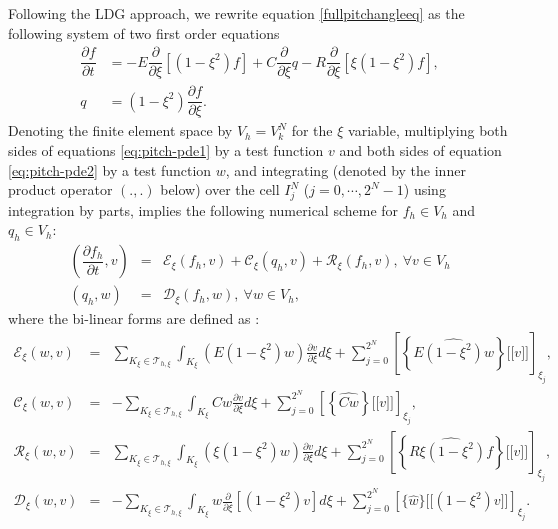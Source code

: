 \documentclass[preprint,11pt]{elsarticle}
\def\ljump{{[\![}}
\def\rjump{{]\!]}}
\begin{document}
Following the LDG approach, we rewrite equation \ref{fullpitchangleeq} as the following system of two first order equations
%
\begin{align}
	\dfrac{\partial f}{\partial t} &= -E\dfrac{\partial}{\partial\xi}[(1-\xi^2)f]+C\dfrac{\partial}{\partial\xi}q-R\dfrac{\partial}{\partial\xi}[\xi(1-\xi^2)f],\label{eq:pitch-pde1}\\
	q &= (1-\xi^2)\dfrac{\partial f}{\partial\xi}. \label{eq:pitch-pde2}
\end{align}
%
Denoting the finite element space by $V_h = V_k^N$ for the $\xi$ variable, multiplying both sides of equations \ref{eq:pitch-pde1} by a test function $v$ and both sides of equation \ref{eq:pitch-pde2} by a test function $w$, and integrating (denoted by the inner product operator $\left(.,.\right)$ below) over the cell $I_j^N$ ($j = 0,\cdots,2^N-1$) using integration by parts, implies the following numerical scheme for $f_h\in V_h$ and $q_h\in V_h$:
%
\begin{eqnarray}
\label{numericalschemepitchangle1}
(\dfrac{\partial f_h}{\partial t},v) &=& \mathcal{E}_{\xi}(f_h,v)+\mathcal{C}_{\xi}(q_h,v)+\mathcal{R}_{\xi}(f_h,v),\ \forall v\in V_h\\
\label{numericalschemepitchangle2}
(q_h,w)&=& \mathcal{D}_{\xi}(f_h,w),\ \forall w\in V_h,
\end{eqnarray}
%
where the bi-linear forms are defined as :
%
\begin{eqnarray}
\mathcal{E}_{\xi}(w,v) &=& \sum_{K_{\xi}\in \mathcal{T}_{h,\xi}}\int_{K_\xi}(E(1-\xi^2)w)\frac{\partial v}{\partial\xi} d\xi+\sum_{j=0}^{2^N} \left[\left\{\widehat{ E(1-\xi^2){w}}\right\}\ljump v\rjump\right]_{\xi_j}, 
\\
\mathcal{C}_{\xi}(w,v) &=& -\sum_{K_{\xi}\in \mathcal{T}_{h,\xi}}\int_{K_{\xi}}Cw\frac{\partial v}{\partial\xi}d\xi+
\sum_{j=0}^{2^N} \left[\left\{ \widehat{Cw}\right\}\ljump v\rjump\right]_{\xi_j},
\\
\mathcal{R}_{\xi}(w,v) &=&
\sum_{K_{\xi}\in \mathcal{T}_{h,\xi}}\int_{K_{\xi}}(\xi(1-\xi^2)w)\frac{\partial v}{\partial\xi}d\xi+
\sum_{j=0}^{2^N} \left[\left\{ \widehat{R\xi(1-\xi^2){f}}\right\}\ljump v\rjump\right]_{\xi_j},
\\
\mathcal{D}_{\xi}(w,v)&=&
-\sum_{K_{\xi}\in \mathcal{T}_{h,\xi}}\int_{K_{\xi}}w\frac{\partial}{\partial\xi}\left[(1-\xi^2)v\right]d\xi+
\sum_{j=0}^{2^N} \left[\{ \widehat{w}\}\ljump(1-\xi^2)v\rjump
\right]_{\xi_j}.
\end{eqnarray}
\end{document}
